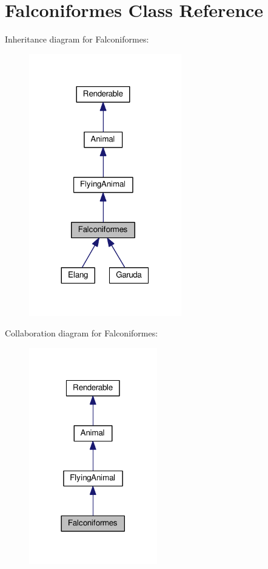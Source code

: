 \hypertarget{classFalconiformes}{}\section{Falconiformes Class Reference}
\label{classFalconiformes}


Inheritance diagram for Falconiformes\+:
\nopagebreak
\begin{figure}[H]
\begin{center}
\leavevmode
\includegraphics[width=188pt]{classFalconiformes__inherit__graph}
\end{center}
\end{figure}


Collaboration diagram for Falconiformes\+:
\nopagebreak
\begin{figure}[H]
\begin{center}
\leavevmode
\includegraphics[width=158pt]{classFalconiformes__coll__graph}
\end{center}
\end{figure}
